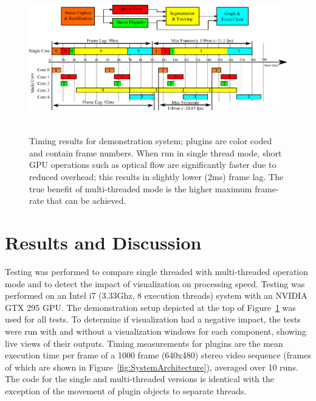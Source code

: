 \begin{figure}[t]
\begin{center}
   \includegraphics[width=0.98\linewidth,height=65mm]{TimingResults.pdf}
\end{center}
   \caption[Timing results for demonstration system]{Timing results for demonstration system; plugins are color coded and contain frame numbers. When run in single thread mode, short GPU operations such as optical flow are significantly faster due to reduced overhead; this results in slightly lower (2ms) frame lag. The true benefit of multi-threaded mode is the higher maximum frame-rate that can be achieved. }
\label{fig:TestMTST}
\end{figure}




\section{Results and Discussion}

Testing was performed to compare single threaded with multi-threaded operation mode and to detect the impact of visualization on processing speed. Testing was performed on an Intel i7 (3.33Ghz, 8 execution threads) system with an NVIDIA GTX 295 GPU. The demonstration setup depicted at the top of Figure~\ref{fig:TestMTST} was used for all tests. To determine if visualization had a negative impact, the tests were run with and without a visualization windows for each component, showing live views of their outputs. Timing measurements for plugins are the mean execution time per frame of a 1000 frame (640x480) stereo video sequence (frames of which are shown in Figure~\ref{fig:SystemArchitecture}), averaged over 10 runs. The code for the single and multi-threaded versions is identical with the exception of the movement of plugin objects to separate threads.

